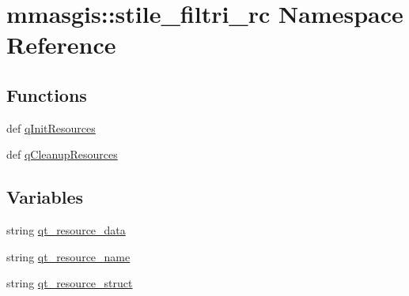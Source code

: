 \hypertarget{namespacemmasgis_1_1stile__filtri__rc}{
\section{mmasgis::stile\_\-filtri\_\-rc Namespace Reference}
\label{namespacemmasgis_1_1stile__filtri__rc}
}
\subsection*{Functions}
\begin{DoxyCompactItemize}
\item 
def \hyperlink{namespacemmasgis_1_1stile__filtri__rc_ae111daabc42f7fadea87a382e7d9c3ec}{qInitResources}
\item 
def \hyperlink{namespacemmasgis_1_1stile__filtri__rc_aff36355fcd344bc4dadc42d47dda8fde}{qCleanupResources}
\end{DoxyCompactItemize}
\subsection*{Variables}
\begin{DoxyCompactItemize}
\item 
string \hyperlink{namespacemmasgis_1_1stile__filtri__rc_a994e04e2d50ff1122730ffdec0a703d9}{qt\_\-resource\_\-data}
\item 
string \hyperlink{namespacemmasgis_1_1stile__filtri__rc_a3e21c74e4c0f1a1aa531393347c175d2}{qt\_\-resource\_\-name}
\item 
string \hyperlink{namespacemmasgis_1_1stile__filtri__rc_ae9f5cb4ad3cce2e98454f540c306b632}{qt\_\-resource\_\-struct}
\end{DoxyCompactItemize}


